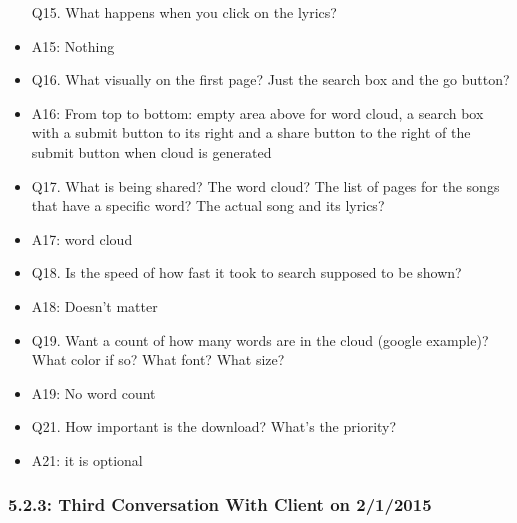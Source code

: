 \documentclass[]{article}
\begin{document}
\begin{itemize}
  Q15. What happens when you click on the lyrics?
\item
  A15: Nothing
\item
  Q16. What visually on the first page? Just the search box and the go
  button?
\item
  A16: From top to bottom: empty area above for word cloud, a search box
  with a submit button to its right and a share button to the right of
  the submit button when cloud is generated
\item
  Q17. What is being shared? The word cloud? The list of pages for the
  songs that have a specific word? The actual song and its lyrics?
\item
  A17: word cloud
\item
  Q18. Is the speed of how fast it took to search supposed to be shown?
\item
  A18: Doesn't matter
\item
  Q19. Want a count of how many words are in the cloud (google example)?
  What color if so? What font? What size?
\item
  A19: No word count
\item
  Q21. How important is the download? What's the priority?
\item
  A21: it is optional
\end{itemize}

\subsubsection{5.2.3: Third Conversation With Client on
2/1/2015}\label{third-conversation-with-client-on-212015}
\end{document}
